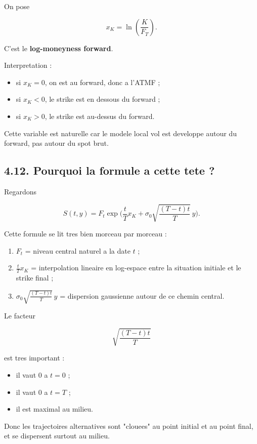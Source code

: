 \documentclass[11pt,a4paper]{article}
\begin{document}
On pose

\[
x_K=\ln\!\left(\frac{K}{F_T}\right).
\]

C'est le \textbf{log-moneyness forward}.

Interpretation :

\begin{itemize}
\item si \(x_K=0\), on est au forward, donc a l'ATMF ;
\item si \(x_K<0\), le strike est en dessous du forward ;
\item si \(x_K>0\), le strike est au-dessus du forward.
\end{itemize}

Cette variable est naturelle car le modele local vol est developpe autour du forward, pas autour du spot brut.

\subsection{4.12. Pourquoi la formule a cette tete ?}

Regardons

\[
S(t,y)=F_t\exp\!\Big(
\frac{t}{T}x_K+\sigma_0\sqrt{\frac{(T-t)t}{T}}\,y
\Big).
\]

Cette formule se lit tres bien morceau par morceau :

\begin{enumerate}
\item \(F_t\) = niveau central naturel a la date \(t\) ;
\item \(\frac{t}{T}x_K\) = interpolation lineaire en log-espace entre la situation initiale et le strike final ;
\item \(\sigma_0\sqrt{\frac{(T-t)t}{T}}\,y\) = dispersion gaussienne autour de ce chemin central.
\end{enumerate}

Le facteur

\[
\sqrt{\frac{(T-t)t}{T}}
\]

est tres important :

\begin{itemize}
\item il vaut \(0\) a \(t=0\) ;
\item il vaut \(0\) a \(t=T\) ;
\item il est maximal au milieu.
\end{itemize}

Donc les trajectoires alternatives sont "clouees" au point initial et au point final, et se dispersent surtout au milieu.
\end{document}
